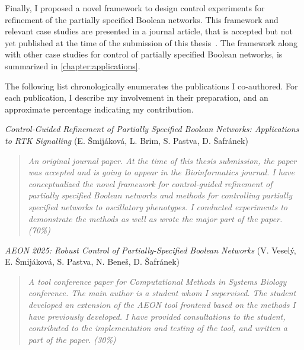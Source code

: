 Finally, I proposed a novel framework to design control experiments for refinement of the partially specified Boolean networks. This framework and relevant case studies are presented in a journal article, that is accepted but not yet published at the time of the submission of this thesis~\spacedlowsmallcaps{[TOAPPEAR]}. The framework along with other case studies for control of partially specified Boolean networks, is summarized in \autoref{chapter:applications}.

The following list chronologically enumerates the publications I co-authored. For each publication, I describe my involvement in their preparation, and an approximate percentage indicating my contribution.



\medskip
\noindent\PrimaryColor{\spacedlowsmallcaps{[TOAPPEAR]}}\hspace{3pt} \emph{Control-Guided Refinement of Partially Specified Bool\-e\-an Networks: Applications to RTK Signalling} (E. Šmijáková, L. Brim, S. Pastva, D. Šafránek)


\begin{quotation}
	\emph{An original journal paper. At the time of this thesis submission, the paper was accepted and is going to appear in the Bioinformatics journal. I have conceptualized the novel framework for control-guided refinement of partially specified Boolean networks and methods for controlling partially specified networks to oscillatory phenotypes. I conducted experiments to demonstrate the methods as well as wrote the major part of the paper. (70\%)}
\end{quotation}


\medskip
\noindent\PrimaryColor{\spacedlowsmallcaps{[CMSB'25]}}\hspace{3pt} \emph{AEON 2025: Robust Control of Partially-Specified Boolean Networks} (V. Veselý, E. Šmijáková, S. Pastva, N. Beneš, D. Šafránek) \cite{Vesely2025}


\begin{quotation}
	\emph{A tool conference paper for Computational Methods in Systems Biology conference. The main author is a student whom I supervised. The student developed an extension of the AEON tool frontend based on the methods I have previously developed. I have provided consultations to the student, contributed to the implementation and testing of the tool, and written a part of the paper. (30\%)}
\end{quotation}


